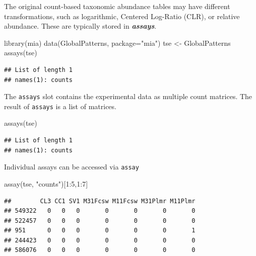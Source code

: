 \documentclass[
]{book}
\newenvironment{Shaded}{\begin{snugshade}}{\end{snugshade}}
\newcommand{\AttributeTok}[1]{\textcolor[rgb]{0.77,0.63,0.00}{#1}}
\newcommand{\DecValTok}[1]{\textcolor[rgb]{0.00,0.00,0.81}{#1}}
\newcommand{\FunctionTok}[1]{\textcolor[rgb]{0.00,0.00,0.00}{#1}}
\newcommand{\NormalTok}[1]{#1}
\newcommand{\OtherTok}[1]{\textcolor[rgb]{0.56,0.35,0.01}{#1}}
\newcommand{\SpecialCharTok}[1]{\textcolor[rgb]{0.00,0.00,0.00}{#1}}
\newcommand{\StringTok}[1]{\textcolor[rgb]{0.31,0.60,0.02}{#1}}
\begin{document}
The original count-based taxonomic abundance tables may have different
transformations, such as logarithmic, Centered Log-Ratio (CLR), or relative
abundance. These are typically stored in \emph{\textbf{assays}}.

\begin{Shaded}
\begin{Highlighting}[]
\FunctionTok{library}\NormalTok{(mia)}
\FunctionTok{data}\NormalTok{(GlobalPatterns, }\AttributeTok{package=}\StringTok{"mia"}\NormalTok{)}
\NormalTok{tse }\OtherTok{\textless{}{-}}\NormalTok{ GlobalPatterns}
\FunctionTok{assays}\NormalTok{(tse)}
\end{Highlighting}
\end{Shaded}

\begin{verbatim}
## List of length 1
## names(1): counts
\end{verbatim}

The \texttt{assays} slot contains the experimental data as multiple count matrices. The result of \texttt{assays} is a list of matrices.

\begin{Shaded}
\begin{Highlighting}[]
\FunctionTok{assays}\NormalTok{(tse)}
\end{Highlighting}
\end{Shaded}

\begin{verbatim}
## List of length 1
## names(1): counts
\end{verbatim}

Individual assays can be accessed via \texttt{assay}

\begin{Shaded}
\begin{Highlighting}[]
\FunctionTok{assay}\NormalTok{(tse, }\StringTok{"counts"}\NormalTok{)[}\DecValTok{1}\SpecialCharTok{:}\DecValTok{5}\NormalTok{,}\DecValTok{1}\SpecialCharTok{:}\DecValTok{7}\NormalTok{]}
\end{Highlighting}
\end{Shaded}

\begin{verbatim}
##        CL3 CC1 SV1 M31Fcsw M11Fcsw M31Plmr M11Plmr
## 549322   0   0   0       0       0       0       0
## 522457   0   0   0       0       0       0       0
## 951      0   0   0       0       0       0       1
## 244423   0   0   0       0       0       0       0
## 586076   0   0   0       0       0       0       0
\end{verbatim}
\end{document}
